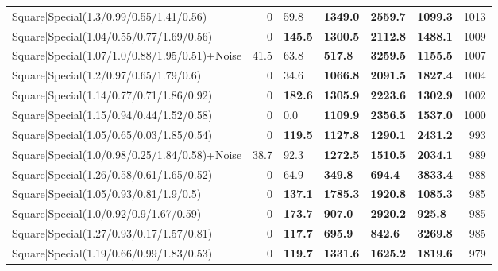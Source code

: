 \begin{tabular}{lrllllr}
 Square|Special(1.3/0.99/0.55/1.41/0.56)                       &             0   & 59.8           & \textbf{1349.0} & \textbf{2559.7} & \textbf{1099.3} &         1013 \\
 Square|Special(1.04/0.55/0.77/1.69/0.56)                      &             0   & \textbf{145.5} & \textbf{1300.5} & \textbf{2112.8} & \textbf{1488.1} &         1009 \\
 Square|Special(1.07/1.0/0.88/1.95/0.51)+Noise                 &            41.5 & 63.8           & \textbf{517.8}  & \textbf{3259.5} & \textbf{1155.5} &         1007 \\
 Square|Special(1.2/0.97/0.65/1.79/0.6)                        &             0   & 34.6           & \textbf{1066.8} & \textbf{2091.5} & \textbf{1827.4} &         1004 \\
 Square|Special(1.14/0.77/0.71/1.86/0.92)                      &             0   & \textbf{182.6} & \textbf{1305.9} & \textbf{2223.6} & \textbf{1302.9} &         1002 \\
 Square|Special(1.15/0.94/0.44/1.52/0.58)                      &             0   & 0.0            & \textbf{1109.9} & \textbf{2356.5} & \textbf{1537.0} &         1000 \\
 Square|Special(1.05/0.65/0.03/1.85/0.54)                      &             0   & \textbf{119.5} & \textbf{1127.8} & \textbf{1290.1} & \textbf{2431.2} &          993 \\
 Square|Special(1.0/0.98/0.25/1.84/0.58)+Noise                 &            38.7 & 92.3           & \textbf{1272.5} & \textbf{1510.5} & \textbf{2034.1} &          989 \\
 Square|Special(1.26/0.58/0.61/1.65/0.52)                      &             0   & 64.9           & \textbf{349.8}  & \textbf{694.4}  & \textbf{3833.4} &          988 \\
 Square|Special(1.05/0.93/0.81/1.9/0.5)                        &             0   & \textbf{137.1} & \textbf{1785.3} & \textbf{1920.8} & \textbf{1085.3} &          985 \\
 Square|Special(1.0/0.92/0.9/1.67/0.59)                        &             0   & \textbf{173.7} & \textbf{907.0}  & \textbf{2920.2} & \textbf{925.8}  &          985 \\
 Square|Special(1.27/0.93/0.17/1.57/0.81)                      &             0   & \textbf{117.7} & \textbf{695.9}  & \textbf{842.6}  & \textbf{3269.8} &          985 \\
 Square|Special(1.19/0.66/0.99/1.83/0.53)                      &             0   & \textbf{119.7} & \textbf{1331.6} & \textbf{1625.2} & \textbf{1819.6} &          979 \\

\end{tabular}

